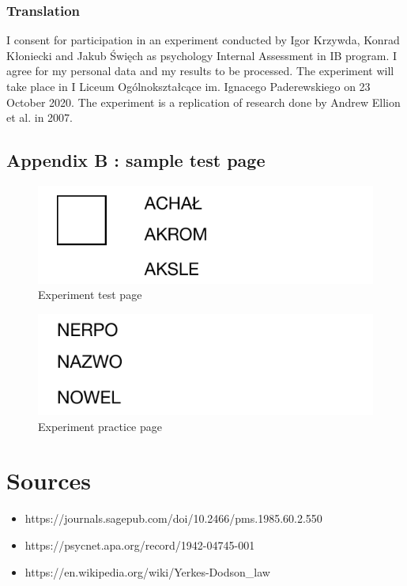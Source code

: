 \documentclass[12pt, a4]{article}
\begin{document}
\subsubsection*{Translation}
I consent for participation in an experiment conducted by Igor Krzywda, Konrad Kłoniecki and Jakub Święch as psychology Internal Assessment in IB program. I agree for my personal 
data and my results to be processed. The experiment will take place in I Liceum Ogólnokształcące im. Ignacego Paderewskiego on 23 October 2020. The experiment is a replication of
research done by Andrew Ellion et al. in 2007.
\subsection*{Appendix B : sample test page}
\begin{figure}[H]
\centering
    \caption{Experiment test page}
    \includegraphics[width=\linewidth]{exp_test}
\end{figure}
\begin{figure}[H]
\centering
    \caption{Experiment practice page}
    \includegraphics[width=\linewidth]{exp_pr}
\end{figure}
\section*{Sources}
\begin{itemize}
    \item https://journals.sagepub.com/doi/10.2466/pms.1985.60.2.550
    \item https://psycnet.apa.org/record/1942-04745-001
    \item https://en.wikipedia.org/wiki/Yerkes-Dodson\_law
\end{itemize}
\end{document}
